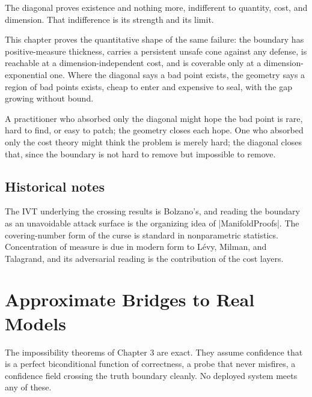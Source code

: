\documentclass{memoir}
\begin{document}
The diagonal proves existence and nothing more, indifferent to quantity, cost,
and dimension. That indifference is its strength and its limit.

This chapter proves the quantitative shape of the same failure: the boundary has
positive-measure thickness, carries a persistent unsafe cone against any
defense, is reachable at a dimension-independent cost, and is coverable only at
a dimension-exponential one. Where the diagonal says a bad point exists, the
geometry says a region of bad points exists, cheap to enter and expensive to
seal, with the gap growing without bound.

A practitioner who absorbed only the diagonal might hope the bad point is rare,
hard to find, or easy to patch; the geometry closes each hope. One who absorbed
only the cost theory might think the problem is merely hard; the diagonal closes
that, since the boundary is not hard to remove but impossible to remove.



\section{Historical notes}\label{Two--Schemas--of--Impossibility-005F-005F-005F--Machine--Checked--Limits--of--Trustworthy--Machine--Learning-005F-005F-005F--and--Why--They--Tighten--with--Capability----The--Geometry--of--Attacks----Historical--notes}

The IVT underlying the crossing results is Bolzano's, and reading the boundary
as an unavoidable attack surface is the organizing idea of \LeanVerb|ManifoldProofs|. The
covering-number form of the curse is standard in nonparametric statistics.
Concentration of measure is due in modern form to Lévy, Milman, and Talagrand,
and its adversarial reading is the contribution of the cost layers.





\chapter{Approximate Bridges to Real Models}\label{Two--Schemas--of--Impossibility-005F-005F-005F--Machine--Checked--Limits--of--Trustworthy--Machine--Learning-005F-005F-005F--and--Why--They--Tighten--with--Capability----Approximate--Bridges--to--Real--Models}

The impossibility theorems of Chapter 3 are exact. They assume confidence that
is a perfect biconditional function of correctness, a probe that never misfires,
a confidence field crossing the truth boundary cleanly. No deployed system meets
any of these.
\end{document}
